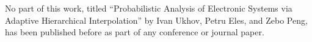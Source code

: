 No part of this work, titled ``Probabilistic Analysis of Electronic Systems via
Adaptive Hierarchical Interpolation'' by Ivan Ukhov, Petru Eles, and Zebo Peng,
has been published before as part of any conference or journal paper.
